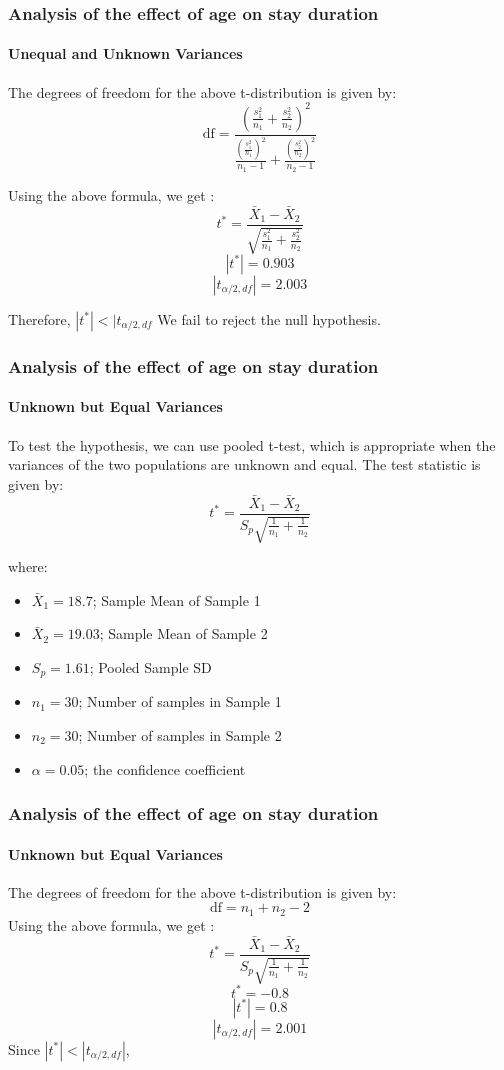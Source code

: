 \documentclass{beamer}
\begin{document}
\begin{frame}
\frametitle{Analysis of the effect of age on
stay duration}
\framesubtitle{Unequal and Unknown Variances}
The degrees of freedom for the above t-distribution is given by:
\[ \text{df} = \frac{\left(\frac{s_1^2}{n_1} + \frac{s_2^2}{n_2}\right)^2}{\frac{\left(\frac{s_1^2}{n_1}\right)^2}{n_1 - 1} + \frac{\left(\frac{s_2^2}{n_2}\right)^2}{n_2 - 1}} \]

Using the above formula, we get :
\[ t^* = \frac{\bar{X}_1 - \bar{X}_2}{\sqrt{\frac{s_1^2}{n_1} + \frac{s_2^2}{n_2}}} \]
\[ |t^*| = 0.903\]
\[|t_{\alpha/2, df}| = 2.003\] 

Therefore, $ |t^*| < |t_{\alpha/2, df}$
We fail to reject the null hypothesis.
\end{frame}

\begin{frame}
\frametitle{Analysis of the effect of age on
stay duration}
\framesubtitle{Unknown but Equal Variances}
To test the hypothesis, we can use pooled t-test, which is appropriate when the variances of the two populations are unknown and equal. The test statistic is given by:
\[ t^* = \frac{\bar{X}_1 - \bar{X}_2}{S_p \sqrt{\frac{1}{n_1} + \frac{1}{n_2}}} \]

where:
\begin{itemize}
    \item $\bar{X}_1 = 18.7$; Sample Mean of Sample 1
    \item $\bar{X}_2 = 19.03$; Sample Mean of Sample 2
    \item $S_p = 1.61$; Pooled Sample SD
    \item $n_1 = 30$; Number of samples in Sample 1 
    \item $n_2 = 30$; Number of samples in Sample 2
    \item $\alpha = 0.05$; the confidence coefficient
\end{itemize}
\end{frame}

\begin{frame}
\frametitle{Analysis of the effect of age on
stay duration}
\framesubtitle{Unknown but Equal Variances}
The degrees of freedom for the above t-distribution is given by:
\[ \text{df} = n_1 + n_2 - 2\]
Using the above formula, we get :
\[ t^* = \frac{\bar{X}_1 - \bar{X}_2}{S_p \sqrt{\frac{1}{n_1} + \frac{1}{n_2}}}\]
\[ t^* = -0.8\]
\[ |t^*| = 0.8\]
\[|t_{\alpha/2, df}| = 2.001\] 
Since $|t^*| < |t_{\alpha/2, df}|$,\\
\end{frame}
\end{document}
